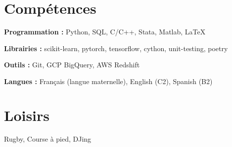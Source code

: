 \documentclass[letterpaper,11pt]{article}
\newcommand{\resumeSubHeadingListStart}{\begin{itemize}[leftmargin=0.15in, label={}]}
\newcommand{\resumeSubHeadingListEnd}{\end{itemize}}
\begin{document}
\section{Compétences}
  \vspace{2pt}
  \resumeSubHeadingListStart
    \small{\item{
        \textbf{Programmation :}{ Python, SQL, C/C++, Stata, Matlab, \LaTeX} \\ \vspace{3pt}
        
        \textbf{Librairies :}{ scikit-learn, pytorch, tensorflow, cython, unit-testing, poetry} \\ \vspace{3pt}

        \textbf{Outils :}{ Git, GCP BigQuery, AWS Redshift} \\ \vspace{3pt}
        
        \textbf{Langues :}{ Français (langue maternelle), English (C2), Spanish (B2)}
        
    }}
  \resumeSubHeadingListEnd







\section{Loisirs}
  \resumeSubHeadingListStart
    \small{\item{Rugby, Course à pied, DJing}}
  \resumeSubHeadingListEnd



\end{document}
